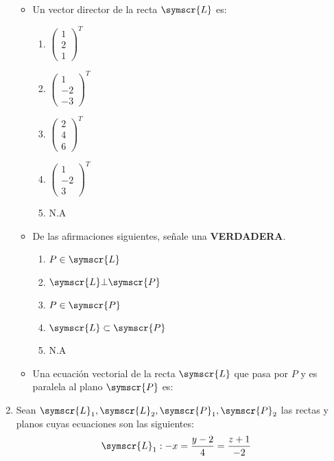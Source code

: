 \documentclass{article}
\def\fancyL{\symscr{L}}
\def\fancyP{\symscr{P}}
\begin{document}
\begin{enumerate}
        \begin{itemize}
            \item Un vector director de la recta \(\fancyL\) es:
                \begin{enumerate}[label=\listAlph]
                    \item \(\begin{pmatrix}1 \\ 2 \\ 1\end{pmatrix}^T\)
					\item \(\begin{pmatrix}1 \\ -2 \\ -3\end{pmatrix}^T\)
					\item \(\begin{pmatrix}2 \\ 4 \\ 6\end{pmatrix}^T\)
					\item \(\begin{pmatrix}1 \\ -2 \\ 3\end{pmatrix}^T\)
					\item N.A
                \end{enumerate}
            \item De las afirmaciones siguientes, señale una \textbf{VERDADERA}.
                \begin{enumerate}
                    \item \(P \in \fancyL\)
                    \item \(\fancyL \bot \fancyP\)
                    \item \(P \in \fancyP\)
                    \item \(\fancyL \subset \fancyP\)
                    \item N.A
                \end{enumerate}
            \item Una ecuación vectorial de la recta \(\fancyL\) que pasa por \(P\) y es paralela al plano \(\fancyP\) es:
        \end{itemize}
\setcounter{enumi}{20}
\item Sean \(\fancyL_1, \fancyL_2, \fancyP_1, \fancyP_2\) las rectas y planos cuyas ecuaciones son las siguientes:
    \[
        \begin{aligned}
            \fancyL_1 &: -x = \frac{y - 2}{4} = \frac{z + 1}{-2}

\end{aligned}\]
\end{enumerate}
\end{document}
